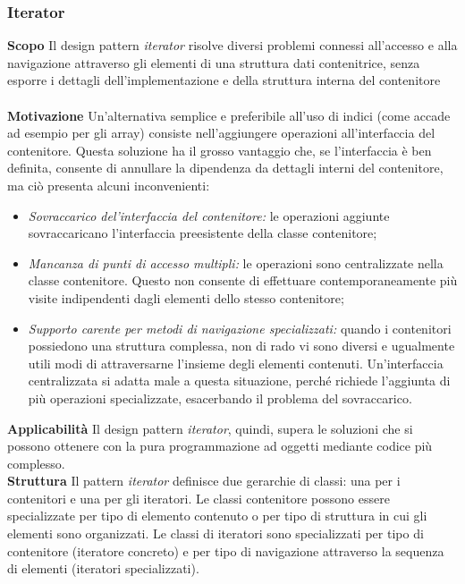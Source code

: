 \subsubsection{Iterator}
\textbf{Scopo}	Il design pattern \textit{iterator} risolve diversi problemi connessi all'accesso e alla navigazione attraverso gli elementi di una struttura dati contenitrice, senza esporre i dettagli dell'implementazione e della struttura interna del contenitore
\\\\
\textbf{Motivazione}	Un'alternativa semplice e preferibile all'uso di indici (come accade ad esempio per gli array) consiste nell'aggiungere operazioni all'interfaccia del contenitore. Questa soluzione ha il grosso vantaggio che, se l'interfaccia è ben definita, consente di annullare la dipendenza da dettagli interni del contenitore, ma ciò presenta alcuni inconvenienti:
	\begin{itemize}
		\item \textit{Sovraccarico del'interfaccia del contenitore:} le operazioni aggiunte sovraccaricano l'interfaccia preesistente della classe contenitore;
		\item \textit{Mancanza di punti di accesso multipli:} le operazioni sono centralizzate nella classe contenitore. Questo non consente di effettuare contemporaneamente più visite indipendenti dagli elementi dello stesso contenitore;
		\item \textit{Supporto carente per metodi di navigazione specializzati:} quando i contenitori possiedono una struttura complessa, non di rado vi sono diversi e ugualmente utili modi di attraversarne l'insieme degli elementi contenuti. Un'interfaccia centralizzata si adatta male a questa situazione, perché richiede l'aggiunta di più operazioni specializzate, esacerbando il problema del sovraccarico.
	\end{itemize}
\textbf{Applicabilità}	Il design pattern \textit{iterator}, quindi, supera le soluzioni che si possono ottenere con la pura programmazione ad oggetti mediante codice più complesso.
\\
\textbf{Struttura}	Il pattern \textit{iterator} definisce due gerarchie di classi: una per i contenitori e una per gli iteratori. Le classi contenitore possono essere specializzate per tipo di elemento contenuto o per tipo di struttura in cui gli elementi sono organizzati. Le classi di iteratori sono specializzati per tipo di contenitore (iteratore concreto) e per tipo di navigazione attraverso la sequenza di elementi (iteratori specializzati).
